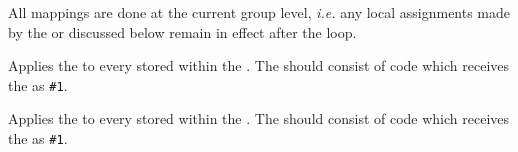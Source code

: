 \documentclass[oneside]{book}
\begin{document}
All mappings are done at the current group level, \emph{i.e.} any
local assignments made by the  or  discussed
below remain in effect after the loop.

%

\begin{function}{\TlMapInline}
\begin{syntax}
  
\end{syntax}
Applies the  to every  stored within the
. The   should consist of code which
receives the  as \verb|#1|.
\end{function}

\begin{function}{\TlVarMapInline}
\begin{syntax}
  
\end{syntax}
Applies the  to every  stored within the
. The  should consist of code which
receives the  as \verb|#1|.
\end{function}
\end{document}
